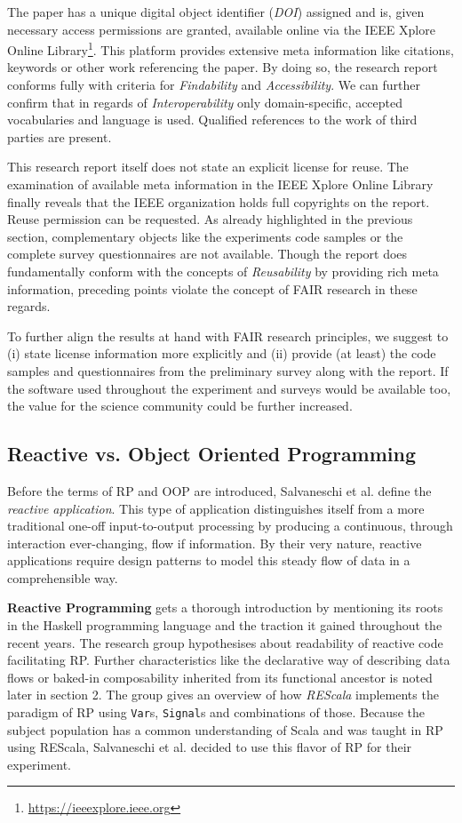 \documentclass[12pt,a4paper]{article}
\begin{document}
The paper has a unique digital object identifier (\emph{DOI}) assigned and is, given necessary access permissions are granted, available online via the IEEE Xplore Online Library\footnote{\url{https://ieeexplore.ieee.org}}. This platform provides extensive meta information like citations, keywords or other work referencing the paper. By doing so, the research report conforms fully with criteria for \emph{Findability} and \emph{Accessibility}. We can further confirm that in regards of \emph{Interoperability} only domain-specific, accepted vocabularies and language is used. Qualified references to the work of third parties are present.

This research report itself does not state an explicit license for reuse. The examination of available meta information in the IEEE Xplore Online Library finally reveals that the IEEE organization holds full copyrights on the report. Reuse permission can be requested. As already highlighted in the previous section, complementary objects like the experiments code samples or the complete survey questionnaires are not available. Though the report does fundamentally conform with the concepts of \emph{Reusability} by providing rich meta information, preceding points violate the concept of FAIR research in these regards.

To further align the results at hand with FAIR research principles, we suggest to (i) state license information more explicitly and (ii) provide (at least) the code samples and questionnaires from the preliminary survey along with the report. If the software used throughout the experiment and surveys would be available too, the value for the science community could be further increased.

\subsection{Reactive vs. Object Oriented Programming}

Before the terms of RP and OOP are introduced, Salvaneschi et al. define the \emph{reactive application}. This type of application distinguishes itself from a more traditional one-off input-to-output processing by producing a continuous, through interaction ever-changing, flow if information. By their very nature, reactive applications require design patterns to model this steady flow of data in a comprehensible way.

\textbf{Reactive Programming} gets a thorough introduction by mentioning its roots in the Haskell programming language and the traction it gained throughout the recent years. The research group hypothesises about readability of reactive code facilitating RP. Further characteristics like the declarative way of describing data flows or baked-in composability inherited from its functional ancestor is noted later in section 2. The group gives an overview of how \emph{REScala} implements the paradigm of RP using \texttt{Var}s, \texttt{Signal}s and combinations of those. Because the subject population has a common understanding of Scala and was taught in RP using REScala, Salvaneschi et al. decided to use this flavor of RP for their experiment.
\end{document}
